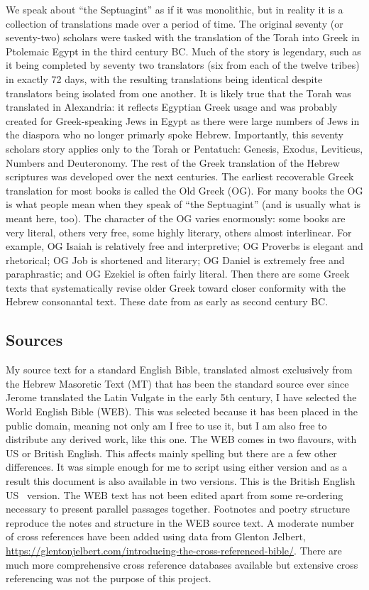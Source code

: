 {{We speak about ``the Septuagint'' as if it was monolithic, but in reality it is a collection of translations made over a period of time. The original seventy (or seventy-two) scholars were tasked with the translation of the Torah into Greek in Ptolemaic Egypt in the third century BC. Much of the story is legendary, such as it being completed by seventy two translators (six from each of the twelve tribes) in exactly 72 days, with the resulting translations being identical despite translators being isolated from one another. It is likely true that the Torah was translated in Alexandria: it reflects Egyptian Greek usage and was probably created for Greek-speaking Jews in Egypt as there were large numbers of Jews in the diaspora who no longer primarly spoke Hebrew. Importantly, this seventy scholars story applies only to the Torah or Pentatuch: Genesis, Exodus, Leviticus, Numbers and Deuteronomy. The rest of the Greek translation of the Hebrew scriptures was developed over the next centuries. The earliest recoverable Greek translation for most books is called the Old Greek (OG). For many books the OG is what people mean when they speak of ``the Septuagint'' (and is usually what is meant here, too). The character of the OG varies enormously: some books are very literal, others very free, some highly literary, others almost interlinear. For example, OG Isaiah is relatively free and interpretive; OG Proverbs is elegant and rhetorical; OG Job is shortened and literary; OG Daniel is extremely free and paraphrastic; and OG Ezekiel is often fairly literal. Then there are some Greek texts that systematically revise older Greek toward closer conformity with the Hebrew consonantal text. These date from as early as second century BC.

\subsection*{Sources}
My source text for a standard English Bible, translated almost exclusively from the Hebrew Masoretic Text (MT) that has been the standard source ever since Jerome translated the Latin Vulgate in the early 5th century, I have selected the World English Bible (WEB). This was selected because it has been placed in the public domain, meaning not only am I free to use it, but I am also free to distribute any derived work, like this one. The WEB comes in two flavours, with US or British English. This affects mainly spelling but there are a few other differences. It was simple enough for me to script using either version and as a result this document is also available in two versions. This is the
\ifbritish
British English
\else
US
\fi\ version. The WEB text has not been edited apart from some re-ordering necessary to present parallel passages together. Footnotes and poetry structure reproduce the notes and structure in the  WEB source text. A moderate number of cross references have been added using data from Glenton Jelbert, \url{https://glentonjelbert.com/introducing-the-cross-referenced-bible/}. There are much more comprehensive cross reference databases available but extensive cross referencing was not the purpose of this project.

}}
